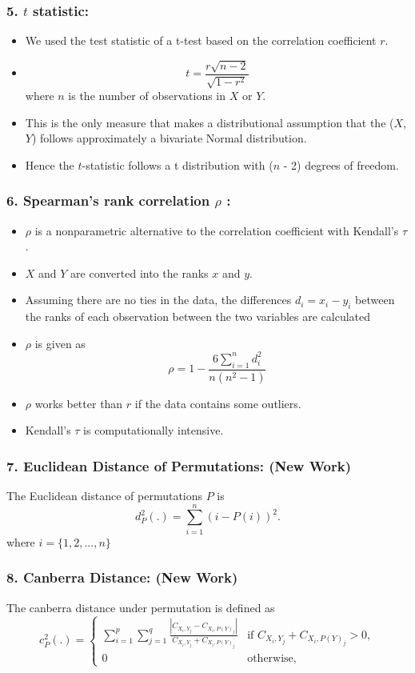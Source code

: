 \documentclass{beamer}
\begin{document}
\begin{frame}
\frametitle{5. $t$ statistic: }
\begin{itemize}
\item We used the test statistic of a t-test based on the correlation coefficient $r$. 
\item  $$t =\frac{r \sqrt{n - 2}}{\sqrt{1 - r^2}}$$ where $n$ is the number of observations in $X$ or $Y$. 
\item This is the only measure that makes a distributional assumption that the ($X$,$Y$) follows approximately a bivariate Normal distribution. 
\item Hence the $t$-statistic follows a t distribution with ($n$ - 2) degrees of freedom.
\end{itemize}
\end{frame}

\begin{frame}
\frametitle{6. Spearman's rank correlation $\rho$ : }
\begin{itemize}
\item $\rho$ is a nonparametric alternative to the correlation coefficient with Kendall's $\tau$. 
\item $X$ and $Y$ are converted into the ranks $x$ and $y$. 
\item Assuming there are no ties in the data, the differences $d_i=x_i - y_i$ between the ranks of each observation between the two variables are calculated 
\item $\rho$ is given as $$\rho = 1 - \frac{6\sum_{i=1}^n d_i^2}{n(n^2 - 1)}$$ 
\item $\rho$ works better than $r$ if the data contains some outliers. 
\item Kendall's $\tau$ is computationally intensive.
\end{itemize}
\end{frame}

\begin{frame}
\frametitle{7. Euclidean Distance of Permutations: (New Work)}

The Euclidean distance of permutations $P$ is 
\[
d^2_P(.) = \sum_{i=1}^n ( i - P(i))^2.
\]
where $i = \{1, 2, ..., n\}$

\end{frame}

\begin{frame}
\frametitle{8. Canberra Distance: (New Work)}
The canberra distance under permutation is defined as
\[
c^2_P(.)  = \left \{ 
\begin{array}{ll}
\sum_{i=1}^p \sum_{j=1}^q \frac{ |C_{X_i,Y_j} - C_{X_i,P(Y)_j}|}{ C_{X_i,Y_j} + C_{X_i,P(Y)_j}} & \text{if } C_{X_i,Y_j} + C_{X_i,P(Y)_j} > 0,\\
0 & \text{otherwise},
\end{array} \right.
\]

\end{frame}
\end{document}
